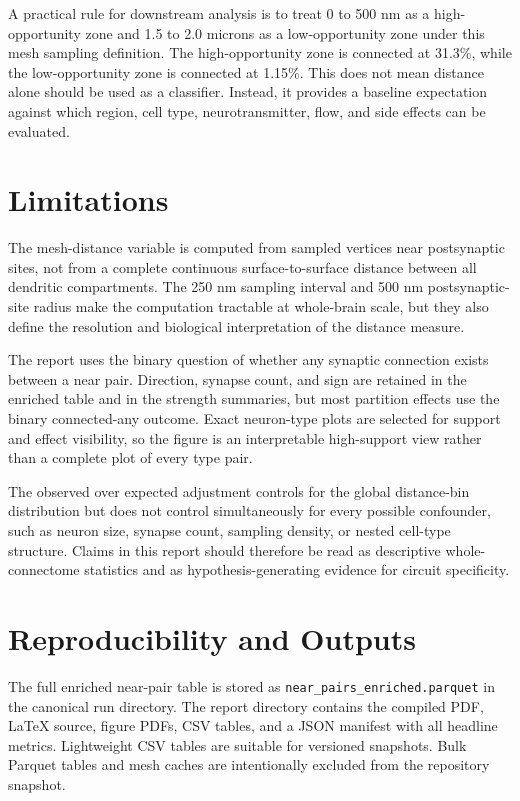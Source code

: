 \documentclass[11pt]{article}
\begin{document}
A practical rule for downstream analysis is to treat 0 to 500 nm as a high-opportunity zone and 1.5 to 2.0 microns as a low-opportunity zone under this mesh sampling definition. The high-opportunity zone is connected at 31.3\%, while the low-opportunity zone is connected at 1.15\%. This does not mean distance alone should be used as a classifier. Instead, it provides a baseline expectation against which region, cell type, neurotransmitter, flow, and side effects can be evaluated.

\section{Limitations}

The mesh-distance variable is computed from sampled vertices near postsynaptic sites, not from a complete continuous surface-to-surface distance between all dendritic compartments. The 250 nm sampling interval and 500 nm postsynaptic-site radius make the computation tractable at whole-brain scale, but they also define the resolution and biological interpretation of the distance measure.

The report uses the binary question of whether any synaptic connection exists between a near pair. Direction, synapse count, and sign are retained in the enriched table and in the strength summaries, but most partition effects use the binary connected-any outcome. Exact neuron-type plots are selected for support and effect visibility, so the figure is an interpretable high-support view rather than a complete plot of every type pair.

The observed over expected adjustment controls for the global distance-bin distribution but does not control simultaneously for every possible confounder, such as neuron size, synapse count, sampling density, or nested cell-type structure. Claims in this report should therefore be read as descriptive whole-connectome statistics and as hypothesis-generating evidence for circuit specificity.

\section{Reproducibility and Outputs}

The full enriched near-pair table is stored as \texttt{near\_pairs\_enriched.parquet} in the canonical run directory. The report directory contains the compiled PDF, LaTeX source, figure PDFs, CSV tables, and a JSON manifest with all headline metrics. Lightweight CSV tables are suitable for versioned snapshots. Bulk Parquet tables and mesh caches are intentionally excluded from the repository snapshot.
\end{document}
